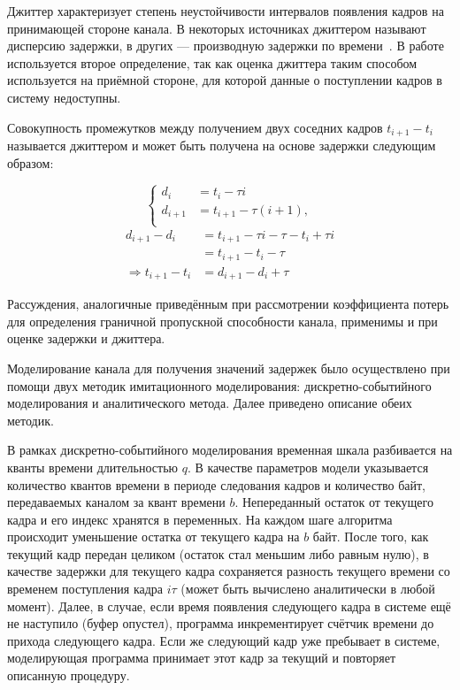 Джиттер характеризует степень неустойчивости интервалов появления
кадров на принимающей стороне канала. В некоторых источниках
джиттером называют дисперсию задержки, в других
--- производную задержки по времени~\cite{jitter}.
В работе используется
второе определение, так как оценка джиттера таким способом
используется на приёмной стороне, для которой данные о поступлении
кадров в систему недоступны.

Совокупность промежутков между получением двух соседних кадров $t_{i+1} - t_i$
называется джиттером и может быть получена на основе задержки следующим образом:

\begin{equation}
    \left\{
    \begin{aligned}
        d_i &= t_i - \tau i\\
        d_{i+1} &= t_{i+1} - \tau (i+1),\\
    \end{aligned}
    \right.
\end{equation}
\begin{equation}
    \begin{aligned}
    d_{i+1} - d_i &= t_{i+1} - \tau i - \tau - t_i + \tau i\\
                  &= t_{i+1} - t_i - \tau\\
    \Longrightarrow t_{i+1} - t_i &= d_{i+1} - d_i + \tau
    \end{aligned}
\end{equation}

Рассуждения, аналогичные приведённым при рассмотрении коэффициента
потерь для определения граничной пропускной способности канала,
применимы и при оценке задержки и джиттера.

Моделирование канала для получения значений задержек было
осуществлено при помощи двух методик имитационного моделирования:
дискретно-событийного моделирования и аналитического метода.
Далее приведено описание обеих методик.

В рамках дискретно-событийного моделирования временная шкала
разбивается на кванты времени длительностью $q$. В качестве 
параметров модели указывается количество квантов времени в
периоде следования кадров и количество байт, передаваемых
каналом за квант времени $b$. Непереданный остаток от текущего
кадра и его индекс хранятся в переменных. На каждом шаге
алгоритма происходит уменьшение остатка от текущего кадра
на $b$ байт. После того, как текущий кадр передан целиком
(остаток стал меньшим либо равным нулю), в качестве задержки
для текущего кадра сохраняется разность текущего времени со
временем поступления кадра $i \tau$ (может быть вычислено аналитически в любой момент).
Далее, в случае, если время появления следующего кадра в системе
ещё не наступило (буфер опустел), программа инкрементирует
счётчик времени до прихода следующего кадра. Если же следующий
кадр уже пребывает в системе, моделирующая программа принимает
этот кадр за текущий и повторяет описанную процедуру.

